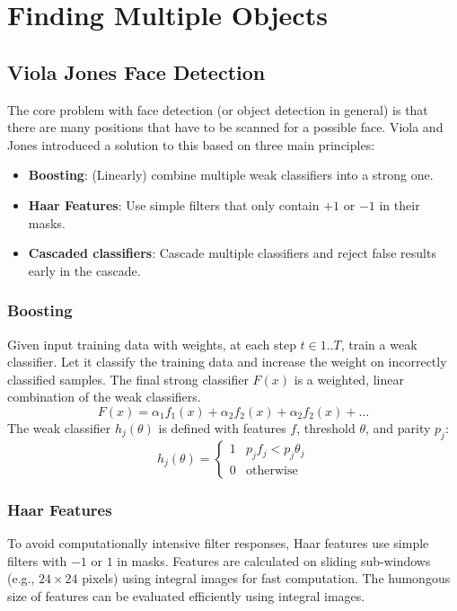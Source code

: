\section{Finding Multiple Objects}


\subsection{Viola Jones Face Detection}

The core problem with face detection (or object detection in general) is that there are many positions that have to be scanned for a possible face.
Viola and Jones introduced a solution to this based on three main principles:
\begin{itemize}
	\item \textbf{Boosting}: (Linearly) combine multiple weak classifiers into a strong one.
	\item \textbf{Haar Features}: Use simple filters that only contain \(+1\) or \(-1\) in their masks.
	\item \textbf{Cascaded classifiers}: Cascade multiple classifiers and reject false results early in the cascade.
\end{itemize}
\subsubsection{Boosting}
Given input training data with weights, at each step $t \in 1..T$, train a weak classifier.
Let it classify the training data and increase the weight on incorrectly classified samples.
The final strong classifier $F(x)$ is a weighted, linear combination of the weak classifiers.
\[
F(x) = \alpha_1 f_1(x) + \alpha_2 f_2(x) + \alpha_2 f_2(x) + \dots
\]
The weak classifier $h_j (\theta)$ is defined with features $f$, threshold $\theta$, and parity $p_j$:
\[
h_j (\theta) = \begin{cases}
1 & p_j f_j < p_j \theta_j \\
0 & \text{otherwise}
\end{cases}
\]

\subsubsection{Haar Features}
To avoid computationally intensive filter responses, Haar features use simple filters with $-1$ or $1$ in masks.
Features are calculated on sliding sub-windows (e.g., $24\times24$ pixels) using integral images for fast computation.
The humongous size of features can be evaluated efficiently using integral images.

